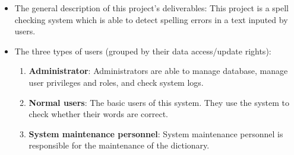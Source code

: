 
\begin{itemize} 
\item{The general description of this project's deliverables: } 
This project is a spell checking system which is able to detect spelling errors in a text inputed by users.
\item{The three types of users (grouped by their data access/update rights): }
\begin{enumerate}
	\item {\textbf{Administrator}: Administrators are able to manage database, manage user privileges and roles, and check system logs.}
	\item {\textbf{Normal users}: The basic users of this system. They use the system to check whether their words are correct.}
	\item {\textbf{System maintenance personnel}: System maintenance personnel is responsible for the maintenance of the dictionary.}
\end{enumerate}


\end{itemize}
